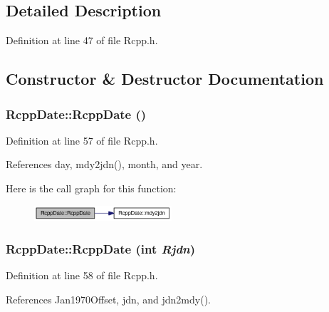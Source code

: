 \subsection{Detailed Description}


Definition at line 47 of file Rcpp.h.

\subsection{Constructor \& Destructor Documentation}
\hypertarget{classRcppDate_4f0f6ae9e9e284fd058d615bcd78d6f9}{
\subsubsection[RcppDate]{\setlength{\rightskip}{0pt plus 5cm}RcppDate::RcppDate ()}}
\label{classRcppDate_4f0f6ae9e9e284fd058d615bcd78d6f9}




Definition at line 57 of file Rcpp.h.

References day, mdy2jdn(), month, and year.

Here is the call graph for this function:\nopagebreak
\begin{figure}[H]
\begin{center}
\leavevmode
\includegraphics[width=145pt]{classRcppDate_4f0f6ae9e9e284fd058d615bcd78d6f9_cgraph}
\end{center}
\end{figure}
\hypertarget{classRcppDate_21adf306ddf84cf792f888d220bb9a3f}{
\subsubsection[RcppDate]{\setlength{\rightskip}{0pt plus 5cm}RcppDate::RcppDate (int {\em Rjdn})}}
\label{classRcppDate_21adf306ddf84cf792f888d220bb9a3f}




Definition at line 58 of file Rcpp.h.

References Jan1970Offset, jdn, and jdn2mdy().

